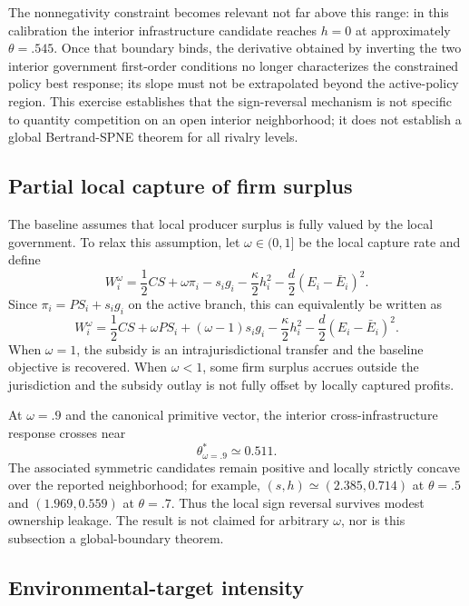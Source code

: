 The nonnegativity constraint becomes relevant not far above this range: in this calibration the interior infrastructure candidate reaches $h=0$ at approximately $\theta=.545$. Once that boundary binds, the derivative obtained by inverting the two interior government first-order conditions no longer characterizes the constrained policy best response; its slope must not be extrapolated beyond the active-policy region. This exercise establishes that the sign-reversal mechanism is not specific to quantity competition on an open interior neighborhood; it does not establish a global Bertrand-SPNE theorem for all rivalry levels.

\subsection{Partial local capture of firm surplus}

The baseline assumes that local producer surplus is fully valued by the local government. To relax this assumption, let $\omega\in(0,1]$ be the local capture rate and define
\begin{equation}
W_i^{\omega}
=\frac12CS+\omega\pi_i-s_i g_i
-\frac{\kappa}{2}h_i^2
-\frac d2(E_i-\bar E_i)^2.
\label{eq:omega-welfare}
\end{equation}
Since $\pi_i=PS_i+s_i g_i$ on the active branch, this can equivalently be written as
\[
W_i^{\omega}
=\frac12CS+\omega PS_i+(\omega-1)s_i g_i
-\frac{\kappa}{2}h_i^2
-\frac d2(E_i-\bar E_i)^2.
\]
When $\omega=1$, the subsidy is an intrajurisdictional transfer and the baseline objective is recovered. When $\omega<1$, some firm surplus accrues outside the jurisdiction and the subsidy outlay is not fully offset by locally captured profits.

At $\omega=.9$ and the canonical primitive vector, the interior cross-infrastructure response crosses near
\[
\theta_{\omega=.9}^*\simeq0.511.
\]
The associated symmetric candidates remain positive and locally strictly concave over the reported neighborhood; for example, $(s,h)\simeq(2.385,0.714)$ at $\theta=.5$ and $(1.969,0.559)$ at $\theta=.7$. Thus the local sign reversal survives modest ownership leakage. The result is not claimed for arbitrary $\omega$, nor is this subsection a global-boundary theorem.

\subsection{Environmental-target intensity}

